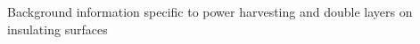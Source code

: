 
{\color{red}
Background information specific to power harvesting and double layers on insulating surfaces}